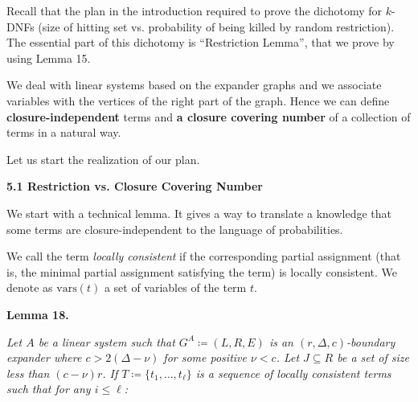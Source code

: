Recall that the plan in the introduction required to prove the dichotomy for $k$-DNFs (size of hitting set
vs. probability of being killed by random restriction). The essential part of this dichotomy is
“Restriction Lemma”, that we prove by using Lemma 15.\par




We deal with linear systems based on the expander graphs and we associate variables with the vertices of
the right part of the graph. Hence we can define \textbf{closure-independent} terms and
\textbf{a closure covering number} of a collection of terms in a natural way.\par




Let us start the realization of our plan.\par




\par\medskip\noindent\textbf{
5.1 Restriction vs. Closure Covering Number}\par




We start with a technical lemma. It gives a way to translate a knowledge that some terms are
closure-independent to the language of probabilities.\par




We call the term \emph{locally consistent} if the corresponding partial assignment
(that is, the minimal partial assignment satisfying the term) is locally consistent. We denote
as $\text{vars}(t)$ a set of variables of the term $t$.\par





\par\medskip\noindent\textbf{
\textbf{Lemma 18}\textbf{.}
}\par



\emph{Let $A$ be a linear system such that $G^{A}\coloneqq(L,R,E)$ is an $(r,\Delta,c)$-boundary
expander where $c>2(\Delta-\nu)$ for some positive $\nu<c$. Let $J\subseteq R$ be a set of
size less than $(c-\nu)r$. If $T\coloneqq\{t_{1},\dots,t_{\ell}\}$ is a sequence of
locally consistent terms such that for any $i\leq\ell$:}\par


